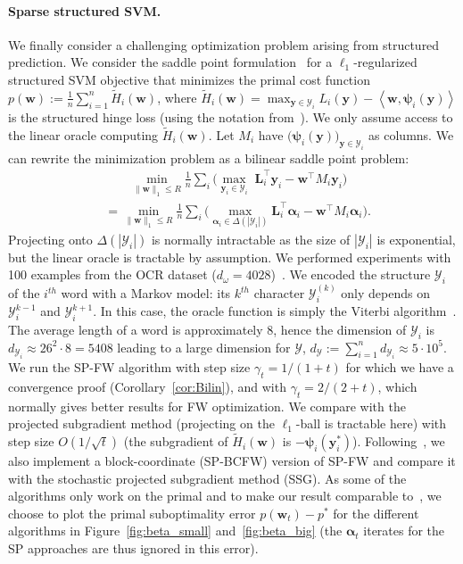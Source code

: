 \documentclass[twoside]{article}
\newcommand{\Y}{\mathcal{Y}}
\newcommand{\y}{\bm{y}}
\newcommand{\innerProd}[2]{\left\langle #1 , #2 \right\rangle}
\newcommand{\0}{\mathbf{0}} %
\begin{document}
 \paragraph{Sparse structured SVM.} %
  \label{par:structured_svm}
  We finally consider a challenging optimization problem arising from structured prediction. We consider the saddle point formulation~\citep{taskar2006dualExtrag} for a $\ell_1$-regularized structured SVM objective that minimizes the primal cost function
%
%
$  p(\bm{w}) :=
    \frac{1}{n} \sum_{i=1}^n \tilde H_i(\bm{w}) 
%
$,
where $\tilde H_i(\bm{w})= \max_{\y \in \mathcal Y_i} L_i(\y) - \innerProd{\bm{w}}{\bm{\psi}_i(\y)}$ is the structured hinge loss (using the notation from~\citet{lacoste2013block}). We only assume access to the linear oracle computing $\tilde H_i(\bm{w})$. Let $M_i$ have $\big(\bm{\psi}_i(\y)\big)_{\y \in \mathcal Y_i}$ as columns.
  We can rewrite the minimization problem as a bilinear saddle point problem:
  \vspace{-2mm}
  \begin{equation}
  \begin{aligned}
   & \qquad \min_{\|\bm{w}\|_1  \leq R} \frac{1}{n} \sum_i \Big( \max_{\y_i \in \mathcal Y_i} \; \bm{L}_i^\top \y_i - \bm{w}^\top M_i \y_i \Big)  \\
   & = \min_{\|\bm{w}\|_1 \leq R} \frac{1}{n} \sum_i \Big( \max_{\bm{\alpha}_i \in \Delta(|\mathcal Y_i|)} \!\!\bm{L}_i^\top \bm{\alpha}_i - \bm{w}^\top M_i \bm{\alpha}_i \Big). \label{eq:structuredSVM}
  \end{aligned}
  \end{equation}
  Projecting onto $\Delta(|\Y_i|)$ is normally intractable as the size of $|\Y_i|$ is exponential, but the linear oracle is tractable by assumption.
  We performed experiments with 100 examples from the OCR
  dataset ($d_\omega \!= \!4028$)~\citep{taskarmax}. We encoded the structure $\Y_i$ of the $i^{th}$ word with a Markov model: its $k^{th}$ character $\Y_i^{(k)}$ only depends on $\Y_i^{k-1}$ and $\Y_i^{k+1}$. In this case, the oracle function is simply the Viterbi algorithm~\citet{viterbi1967error}. 
 The average length of a word is approximately 8, hence the dimension of $\Y_i$ is $d_{\Y_i} \approx 26^2 \cdot 8 = 5408$ leading to a large dimension for $\Y$, $d_\Y := \sum_{i=1}^n d_{\Y_i} \approx  5 \cdot 10^5$.  
 We run the SP-FW algorithm with step size $\gamma_t = 1/(1+t)$ for which we have a convergence proof (Corollary~\ref{cor:Bilin}), and with $\gamma_t = 2/(2+t)$, which normally gives better results for FW optimization. We compare with the projected subgradient method (projecting on the $\ell_1$-ball is tractable here) with step size $O(1/\sqrt{t})$ (the subgradient of $\tilde H_i(\bm{w})$ is $-\bm{\psi}_i(\y_i^*)$). Following~\citet{lacoste2013block}, we also implement a block-coordinate (SP-BCFW) version of SP-FW and compare it with the stochastic projected subgradient method (SSG). As some of the algorithms only work on the primal and to make our result comparable to~\citet{lacoste2013block}, we choose to plot the primal suboptimality error $p(\bm{w}_t)- p^*$ for the different algorithms in Figure~\ref{fig:beta_small} and~\ref{fig:beta_big} (the $\bm{\alpha}_t$ iterates for the SP approaches are thus ignored in this error).
\end{document}
